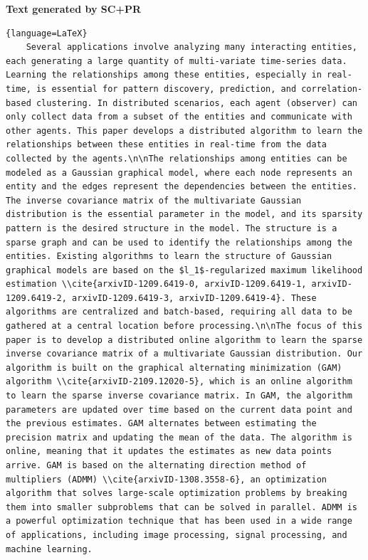 \textbf{Text generated by SC+PR}
\begin{lstlisting}{language=LaTeX}
    Several applications involve analyzing many interacting entities, each generating a large quantity of multi-variate time-series data. Learning the relationships among these entities, especially in real-time, is essential for pattern discovery, prediction, and correlation-based clustering. In distributed scenarios, each agent (observer) can only collect data from a subset of the entities and communicate with  other agents. This paper develops a distributed algorithm to learn the relationships between these entities in real-time from the data collected by the agents.\n\nThe relationships among entities can be modeled as a Gaussian graphical model, where each node represents an entity and the edges represent the dependencies between the entities. The inverse covariance matrix of the multivariate Gaussian distribution is the essential parameter in the model, and its sparsity pattern is the desired structure in the model. The structure is a sparse graph and can be used to identify the relationships among the entities. Existing algorithms to learn the structure of Gaussian graphical models are based on the $l_1$-regularized maximum likelihood estimation \\cite{arxivID-1209.6419-0, arxivID-1209.6419-1, arxivID-1209.6419-2, arxivID-1209.6419-3, arxivID-1209.6419-4}. These algorithms are centralized and batch-based, requiring all data to be gathered at a central location before processing.\n\nThe focus of this paper is to develop a distributed online algorithm to learn the sparse inverse covariance matrix of a multivariate Gaussian distribution. Our algorithm is built on the graphical alternating minimization (GAM) algorithm \\cite{arxivID-2109.12020-5}, which is an online algorithm to learn the sparse inverse covariance matrix. In GAM, the algorithm parameters are updated over time based on the current data point and the previous estimates. GAM alternates between estimating the precision matrix and updating the mean of the data. The algorithm is online, meaning that it updates the estimates as new data points arrive. GAM is based on the alternating direction method of multipliers (ADMM) \\cite{arxivID-1308.3558-6}, an optimization algorithm that solves large-scale optimization problems by breaking them into smaller subproblems that can be solved in parallel. ADMM is a powerful optimization technique that has been used in a wide range of applications, including image processing, signal processing, and machine learning. 

\end{lstlisting}
